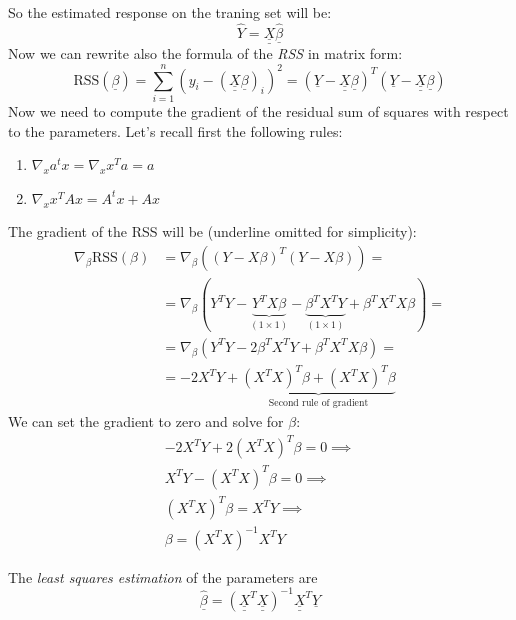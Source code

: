 So the estimated response on the traning set will be:
\[
    \hat{Y} = \underline{\underline{X}} \underline{\hat{\beta}}
\]
Now we can rewrite also the formula of the \textit{RSS} in matrix form:
\[
    \text{RSS}(\underline{\beta})  = \sum_{i=1}^{n} \left(y_i - (\underline{\underline{X}} \underline{\beta})_i\right)^2 = (\underline{Y} - \underline{\underline{X}} \underline{\beta})^T(\underline{Y} - \underline{\underline{X}} \underline{\beta})
\]
Now we need to compute the gradient of the residual sum of squares with respect to the parameters. Let's recall first the following rules:
\begin{enumerate}
    \item $\nabla_x a^t x = \nabla_x x^T a =  a$
    \item $\nabla_x x^T A x = A^t x + A x$
\end{enumerate}
The gradient of the RSS will be (underline omitted for simplicity):
\begin{align*}
    \nabla_\beta \text{RSS} (\beta) & = \nabla_\beta \left((Y- X\beta)^T (Y-X\beta) \right) =                                 \\
                                    & = \nabla_\beta \left(Y^T Y - \underbrace{Y^T X\beta}_{(1\times 1)} - \underbrace{\beta^T X^T Y}_{(1\times 1)} + \beta^T X^T X \beta \right) = \\
                                    & = \nabla_\beta\left(Y^T Y - 2 \beta^T X^T Y + \beta^T X^T X \beta\right) =              \\
                                    & = -2 X^T Y + \underbrace{(X^T X)^T \beta + (X^T X)^T \beta}_{\text{Second rule of gradient}} 
\end{align*}
We can set the gradient to zero and solve for $\beta$:
\begin{align*}
    -2 X^T Y + 2(X^T X)^T \beta = 0 \implies \\
    X^T Y - (X^T X)^T \beta = 0 \implies \\
    (X^T X)^T \beta = X^T Y \implies \\
    \beta = (X^T X)^{-1} X^T Y    
\end{align*}


The \textit{least squares estimation} of the parameters are
\[
    \hat{\underline\beta} = (\underline {\underline X}^T \underline{\underline X} )^{-1} \underline{\underline X}^T \underline Y
\]


